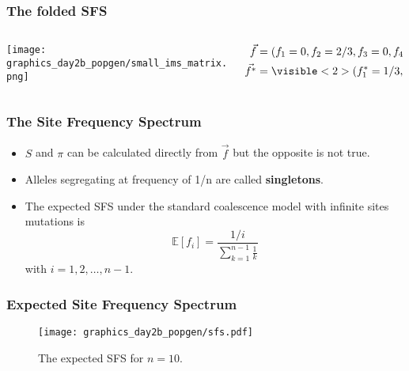 \documentclass{beamer}
\newcommand{\E}{\mathbb{E}}
\newcommand{\1}{\ensuremath{\mathbf{1}}}
\begin{document}
%
%
%
\begin{frame}\frametitle{The folded SFS}
	\begin{columns}
	\begin{column}{0.25\textwidth}
	\begin{center}
		\texttt{[image: graphics\_day2b\_popgen/small\_ims\_matrix.png]}
	\end{center}
	\end{column}
	\begin{column}{0.75\textwidth}
		\begin{equation}
			\begin{split}
				\vec{f} & = (f_1=0, f_2=2/3, f_3=0, f_4=1/3)\\
				\vec{f^*} & = \visible<2>{(f_1^* = 1/3, f_2^* = 2/3)}\\
			\end{split}
		\end{equation}
	\end{column}
	\end{columns}
\end{frame}
%
%
%
\begin{frame}\frametitle{The Site Frequency Spectrum}
	\begin{itemize}
		\item $S$ and $\pi$ can be calculated directly from $\vec{f}$ but the opposite is not true.
		\item Alleles segregating at frequency of 1/n are called \textbf{singletons}.
		\item The expected SFS under the standard coalescence model with
infinite sites mutations is
			\begin{equation}
				\E[f_i] = \frac{1/i}{\sum_{k=1}^{n-1}\tfrac{1}{k}}
			\end{equation}
			with $i = 1,2,\ldots,n-1$.
	\end{itemize}
\end{frame}
%
%
%
\begin{frame}\frametitle{Expected Site Frequency Spectrum}
	\begin{figure}
	\begin{center}
		\texttt{[image: graphics\_day2b\_popgen/sfs.pdf]}
	\end{center}
	\caption{The expected SFS for $n=10$.}
	\end{figure}
\end{frame}
\end{document}
